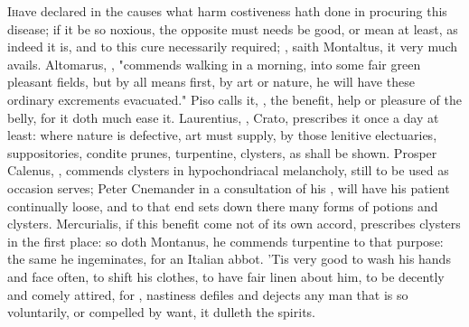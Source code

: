 {\lettrine{I} have declared in the causes what harm costiveness hath done in procuring this disease; if it be so noxious, the opposite must needs be good, or mean at least, as indeed it is, and to this cure necessarily required; , saith Montaltus,  it very much avails. Altomarus, , "commends walking in a morning, into some fair green pleasant fields, but by all means first, by art or nature, he will have these ordinary excrements evacuated." Piso calls it, , the benefit, help or pleasure of the belly, for it doth much ease it. Laurentius, , Crato,  prescribes it once a day at least: where nature is defective, art must supply, by those lenitive electuaries, suppositories, condite prunes, turpentine, clysters, as shall be shown. Prosper Calenus, , commends clysters in hypochondriacal melancholy, still to be used as occasion serves; Peter Cnemander in a consultation of his , will have his patient continually loose, and to that end sets down there many forms of potions and clysters. Mercurialis,  if this benefit come not of its own accord, prescribes clysters in the first place: so doth Montanus,  he commends turpentine to that purpose: the same he ingeminates,  for an Italian abbot. 'Tis very good to wash his hands and face often, to shift his clothes, to have fair linen about him, to be decently and comely attired, for , nastiness defiles and dejects any man that is so voluntarily, or compelled by want, it dulleth the spirits.

}
